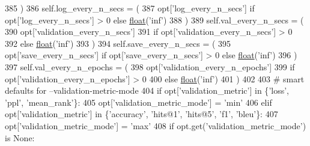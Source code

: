 \begin{DoxyCode}
385         )
386         self.log\_every\_n\_secs = (
387             opt[\textcolor{stringliteral}{'log\_every\_n\_secs'}] \textcolor{keywordflow}{if} opt[\textcolor{stringliteral}{'log\_every\_n\_secs'}] > 0 \textcolor{keywordflow}{else} \hyperlink{namespaceprojects_1_1controllable__dialogue_1_1make__control__dataset_aa2b7207688c641dbc094ab44eca27113}{float}(\textcolor{stringliteral}{'inf'})
388         )
389         self.val\_every\_n\_secs = (
390             opt[\textcolor{stringliteral}{'validation\_every\_n\_secs'}]
391             \textcolor{keywordflow}{if} opt[\textcolor{stringliteral}{'validation\_every\_n\_secs'}] > 0
392             \textcolor{keywordflow}{else} \hyperlink{namespaceprojects_1_1controllable__dialogue_1_1make__control__dataset_aa2b7207688c641dbc094ab44eca27113}{float}(\textcolor{stringliteral}{'inf'})
393         )
394         self.save\_every\_n\_secs = (
395             opt[\textcolor{stringliteral}{'save\_every\_n\_secs'}] \textcolor{keywordflow}{if} opt[\textcolor{stringliteral}{'save\_every\_n\_secs'}] > 0 \textcolor{keywordflow}{else} \hyperlink{namespaceprojects_1_1controllable__dialogue_1_1make__control__dataset_aa2b7207688c641dbc094ab44eca27113}{float}(\textcolor{stringliteral}{'inf'})
396         )
397         self.val\_every\_n\_epochs = (
398             opt[\textcolor{stringliteral}{'validation\_every\_n\_epochs'}]
399             \textcolor{keywordflow}{if} opt[\textcolor{stringliteral}{'validation\_every\_n\_epochs'}] > 0
400             \textcolor{keywordflow}{else} \hyperlink{namespaceprojects_1_1controllable__dialogue_1_1make__control__dataset_aa2b7207688c641dbc094ab44eca27113}{float}(\textcolor{stringliteral}{'inf'})
401         )
402 
403         \textcolor{comment}{# smart defaults for --validation-metric-mode}
404         \textcolor{keywordflow}{if} opt[\textcolor{stringliteral}{'validation\_metric'}] \textcolor{keywordflow}{in} \{\textcolor{stringliteral}{'loss'}, \textcolor{stringliteral}{'ppl'}, \textcolor{stringliteral}{'mean\_rank'}\}:
405             opt[\textcolor{stringliteral}{'validation\_metric\_mode'}] = \textcolor{stringliteral}{'min'}
406         \textcolor{keywordflow}{elif} opt[\textcolor{stringliteral}{'validation\_metric'}] \textcolor{keywordflow}{in} \{\textcolor{stringliteral}{'accuracy'}, \textcolor{stringliteral}{'hits@1'}, \textcolor{stringliteral}{'hits@5'}, \textcolor{stringliteral}{'f1'}, \textcolor{stringliteral}{'bleu'}\}:
407             opt[\textcolor{stringliteral}{'validation\_metric\_mode'}] = \textcolor{stringliteral}{'max'}
408         \textcolor{keywordflow}{if} opt.get(\textcolor{stringliteral}{'validation\_metric\_mode'}) \textcolor{keywordflow}{is} \textcolor{keywordtype}{None}:

\end{DoxyCode}
